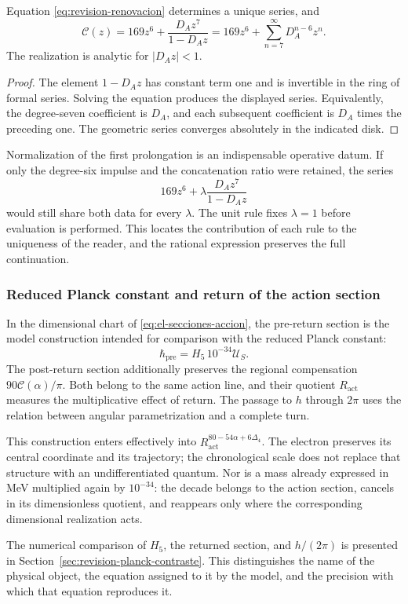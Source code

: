 \begin{proposition}
Equation \eqref{eq:revision-renovacion} determines a unique series, and
\[
 \mathscr C(z)=169z^6+\frac{D_Az^7}{1-D_Az}
             =169z^6+\sum_{n=7}^{\infty}D_A^{n-6}z^n.
\]
The realization is analytic for \(|D_Az|<1\).
\end{proposition}
\begin{proof}
The element \(1-D_Az\) has constant term one and is invertible
in the ring of formal series. Solving the equation produces the displayed
series. Equivalently, the degree-seven coefficient is \(D_A\),
and each subsequent coefficient is \(D_A\) times the preceding one. The
geometric series converges absolutely in the indicated disk.
\end{proof}

Normalization of the first prolongation is an indispensable operative
datum. If only the degree-six impulse and the concatenation ratio
were retained, the series
\[
 169z^6+\lambda\frac{D_Az^7}{1-D_Az}
\]
would still share both data for every \(\lambda\).
The unit rule fixes \(\lambda=1\) before evaluation is performed.
This locates the contribution of each rule to the uniqueness of the
reader, and the rational expression preserves the full continuation.

\subsubsection{Reduced Planck constant and return of the action section}

In the dimensional chart of \eqref{eq:el-secciones-accion}, the
pre-return section is the model construction intended for comparison
with the reduced Planck constant:
\[
 \hbar_{\mathrm{pre}}=H_5\,10^{-34}\mathcal U_S.
\]
The post-return section additionally preserves the regional
compensation \(90\mathscr C(\alpha)/\pi\). Both belong to the same
action line, and their quotient \(R_{\mathrm{act}}\) measures the multiplicative
effect of return. The passage to \(h\) through \(2\pi\) uses the relation
between angular parametrization and a complete turn.

This construction enters effectively into
\(R_{\mathrm{act}}^{80-54\alpha+6\Delta_4}\). The electron preserves
its central coordinate and its trajectory; the chronological scale does not
replace that structure with an undifferentiated quantum. Nor is a mass
already expressed in MeV multiplied again by \(10^{-34}\):
the decade belongs to the action section, cancels in its dimensionless
quotient, and reappears only where the corresponding dimensional
realization acts.

The numerical comparison of \(H_5\), the returned section, and
\(h/(2\pi)\) is presented in Section~\ref{sec:revision-planck-contraste}.
This distinguishes the name of the physical object, the equation
assigned to it by the model, and the precision with which that equation reproduces it.
